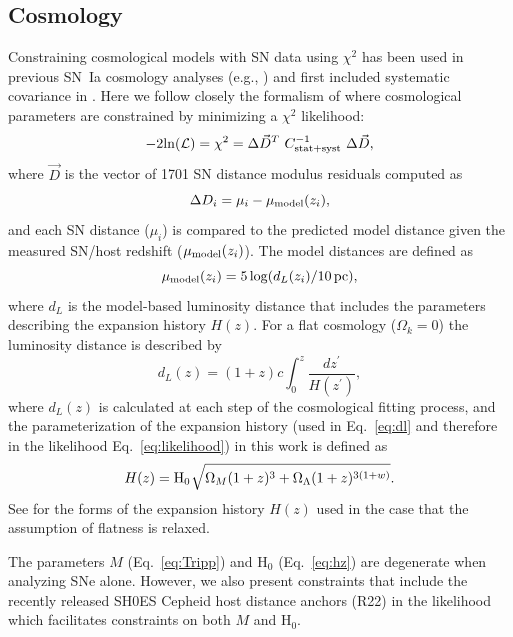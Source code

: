 \documentclass[twocolumn]{aastex63}
\begin{document}
\subsection{Cosmology}
Constraining cosmological models with SN data using $\chi^2$ {has been used in previous SN~Ia cosmology analyses (e.g., \citealt{riess98,Astier06}) and first included systematic covariance in \cite{Conley11}.} Here we follow closely the formalism of \cite{Conley11} where cosmological parameters are constrained by minimizing a $\chi^2$ likelihood:
\begin{equation}
\label{eq:likelihood}
-2{\rm ln}(\mathcal{L}) = \chi^2 = \Delta \vec{D}^T~C_{\rm stat+syst}^{-1}~\Delta \vec{D} ,
\end{equation}
where $\vec{D}$ is the vector of 1701 SN distance modulus residuals computed as
\begin{equation}
\label{eq:dmu}\Delta D_i = \mu_i - \mu_{{\rm model}}(z_i) ,
\end{equation}
and each SN distance ($\mu_i$) is compared to the predicted model distance given the measured SN/host redshift ($\mu_{{\rm model}}(z_i)$). The model distances are defined as 
\begin{equation}
\mu_{{\rm model}}(z_i) = 5\log(d_L(z_i)/10\,{\rm pc}) ,
\end{equation} 
where $d_L$ is the model-based luminosity distance that includes the parameters describing the expansion history $H(z)$. For a flat cosmology ($\Omega_k=0$) the luminosity distance is described by
\begin{equation}
\label{eq:dl}
d_L(z) = (1+z)c\int_0^{z}\frac{dz^\prime}{H(z^\prime)},
\end{equation}
where $d_L(z)$ is calculated at each step of the cosmological fitting process, and the parameterization of the expansion history (used in Eq.~\ref{eq:dl} and therefore in the likelihood Eq.~\ref{eq:likelihood}) in this work is defined as
\begin{equation}
H(z) = {{\rm H}_0}\ \sqrt[]{\Omega_M(1+z)^3+\Omega_{\Lambda}(1+z)^{3(1+w)}}.
\label{eq:hz}
\end{equation}
See \cite{hogg} for the forms of the expansion history $H(z)$ used in the case that the assumption of flatness is relaxed.

The parameters $M$ (Eq.~\ref{eq:Tripp}) and H$_0$ (Eq.~\ref{eq:hz}) are degenerate when analyzing SNe alone. 
However, we also present constraints that include the recently released SH0ES Cepheid host distance anchors (R22) in the likelihood which facilitates constraints on both $M$ and H$_0$.
\end{document}
